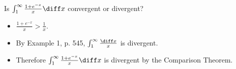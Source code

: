 \begin{frame}
\begin{example}[Example 10, p. 551]
Is $\int_1^\infty \frac{1+e^{-x}}{x}\diff x$ convergent or divergent?

\begin{itemize}
\item<2->  $\frac{1+e^{-x}}{x} > \frac{1}{x}$.
\item<3->  By Example 1, p. 545, $\int_1^\infty \frac{\diff x}{x}$ is divergent.
\item<4->  Therefore $\int_1^\infty \frac{1+e^{-x}}{x}\diff x$ is divergent by the Comparison Theorem.
\end{itemize}
\end{example}
\end{frame}

